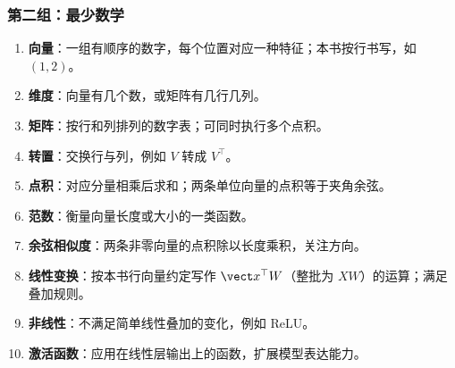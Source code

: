 \subsubsection{第二组：最少数学}
\begin{enumerate}[leftmargin=2.5em,itemsep=4pt,start=11]
\item \textbf{向量}：一组有顺序的数字，每个位置对应一种特征；本书按行书写，如 $(1,2)$。 
\item \textbf{维度}：向量有几个数，或矩阵有几行几列。 
\item \textbf{矩阵}：按行和列排列的数字表；可同时执行多个点积。 
\item \textbf{转置}：交换行与列，例如 $V$ 转成 $V^\top$。 
\item \textbf{点积}：对应分量相乘后求和；两条单位向量的点积等于夹角余弦。 
\item \textbf{范数}：衡量向量长度或大小的一类函数。 
\item \textbf{余弦相似度}：两条非零向量的点积除以长度乘积，关注方向。 
\item \textbf{线性变换}：按本书行向量约定写作 $\vect x^\top W$（整批为 $XW$）的运算；满足叠加规则。 
\item \textbf{非线性}：不满足简单线性叠加的变化，例如 ReLU。 
\item \textbf{激活函数}：应用在线性层输出上的函数，扩展模型表达能力。 
\end{enumerate}

